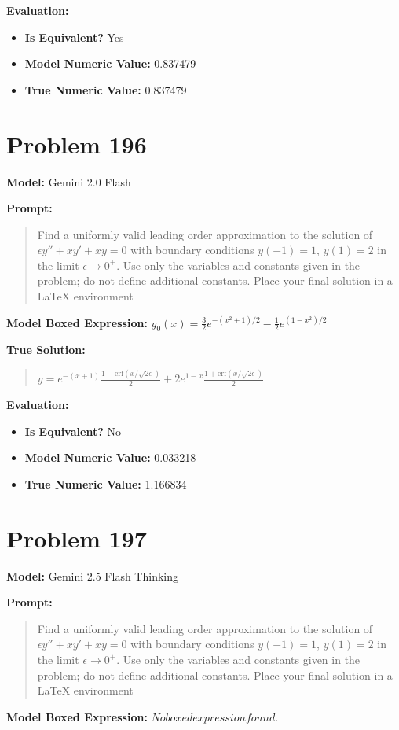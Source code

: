\documentclass{article}
\begin{document}
{\textbf{Evaluation:}
\begin{itemize}
\item \textbf{Is Equivalent?} Yes
\item \textbf{Model Numeric Value:} 0.837479
\item \textbf{True Numeric Value:} 0.837479
\end{itemize}
\vspace{1cm}
\section*{Problem 196}
\textbf{Model:} Gemini 2.0 Flash

\textbf{Prompt:}
\begin{quote}
Find a uniformly valid leading order approximation to the solution of $\epsilon y'' + x y' + x y = 0$ with boundary conditions $y(-1) = 1$, $y(1) = 2$ in the limit $\epsilon \to 0^+$. Use only the variables and constants given in the problem; do not define additional constants. Place your final solution in a $\boxed{}$ LaTeX environment
\end{quote}
\textbf{Model Boxed Expression:} $y_0(x) = \frac{3}{2} e^{-(x^2+1)/2} - \frac{1}{2}e^{(1-x^2)/2}$

\textbf{True Solution:}
\begin{quote}
$y = e^{-(x+1)} \frac{1-\text{erf}(x/\sqrt{2\epsilon})}{2} + 2e^{1-x} \frac{1+\text{erf}(x/\sqrt{2\epsilon})}{2}$
\end{quote}

\textbf{Evaluation:}
\begin{itemize}
\item \textbf{Is Equivalent?} No
\item \textbf{Model Numeric Value:} 0.033218
\item \textbf{True Numeric Value:} 1.166834
\end{itemize}
\vspace{1cm}
\section*{Problem 197}
\textbf{Model:} Gemini 2.5 Flash Thinking

\textbf{Prompt:}
\begin{quote}
Find a uniformly valid leading order approximation to the solution of $\epsilon y'' + x y' + x y = 0$ with boundary conditions $y(-1) = 1$, $y(1) = 2$ in the limit $\epsilon \to 0^+$. Use only the variables and constants given in the problem; do not define additional constants. Place your final solution in a $\boxed{}$ LaTeX environment
\end{quote}
\textbf{Model Boxed Expression:} $No boxed expression found.$

}
\end{document}
